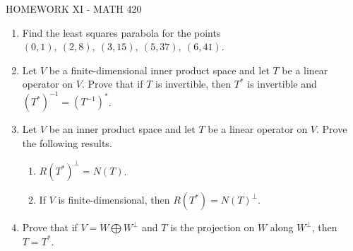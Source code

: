 \documentclass{article}
\begin{document}
\centerline{HOMEWORK XI - MATH 420}

\begin{enumerate}

\item Find the least squares parabola for the points $(0,1), \ (2,8),\ (3,15),\ (5,37),\ (6,41)$.

\item Let $V$ be a finite-dimensional inner product space and let $T$ be a linear operator on $V$. Prove that if $T$ is invertible, then $T^*$ is invertible and $(T^*)^{-1}=(T^{-1})^*$.

\item Let $V$ be an inner product space and let $T$ be a linear operator on $V$. Prove the following results.
\begin{enumerate}
\item $R(T^*)^\perp=N(T)$.
\item If $V$ is finite-dimensional, then $R(T^*)=N(T)^\perp$.
\end{enumerate}

\item Prove that if $V=W\bigoplus W^\perp$ and $T$ is the projection on $W$ along $W^\perp$, then $T=T^*$.







     \end{enumerate}
     
\end{document}
